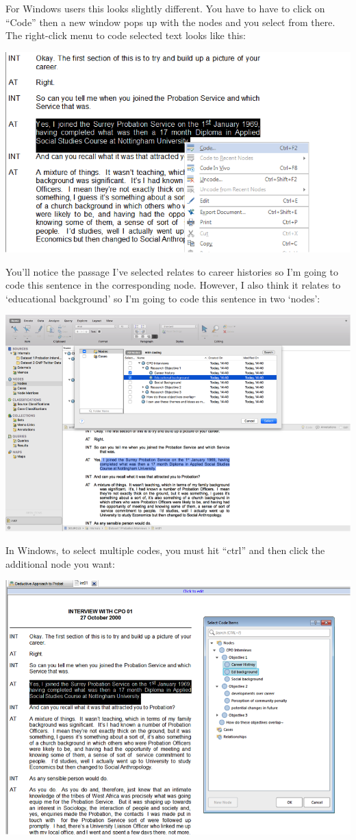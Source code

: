 \documentclass[]{book}
\theoremstyle{definition}
\theoremstyle{definition}
\theoremstyle{definition}
\theoremstyle{remark}
\begin{document}
For Windows users this looks slightly different. You have to have to
click on ``Code'' then a new window pops up with the nodes and you
select from there. The right-click menu to code selected text looks like
this:

\includegraphics{imgs/qual_43.png}

You'll notice the passage I've selected relates to career histories so
I'm going to code this sentence in the corresponding node. However, I
also think it relates to `educational background' so I'm going to code
this sentence in two `nodes':

\includegraphics{imgs/qual_44.png}

In Windows, to select multiple codes, you must hit ``ctrl'' and then
click the additional node you want:

\includegraphics{imgs/qual_45.png}
\end{document}
